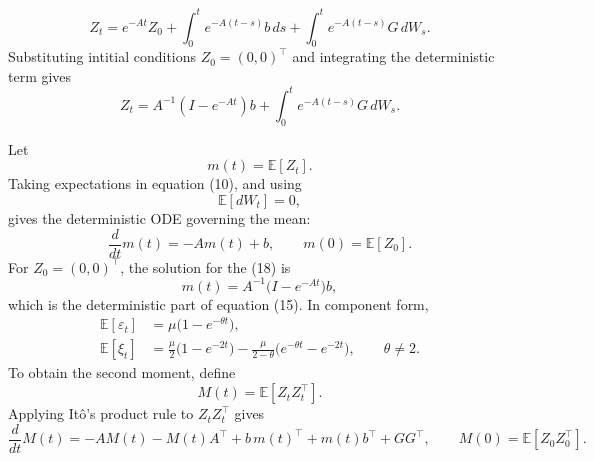 \documentclass[11pt]{article}
\begin{document}
\begin{equation}
    Z_t=e^{-At}Z_0+\int_0^t e^{-A(t-s)}b\,ds
    +\int_0^t e^{-A(t-s)}G\,dW_s.
\end{equation}
Substituting intitial conditions $Z_0=(0,0)^\top$ and integrating the deterministic term gives
\begin{equation}
    Z_t=  A^{-1}(I-e^{-At})b
    +\int_0^t e^{-A(t-s)}G\,dW_s.
\end{equation}




Let
\begin{equation}
    m(t)=\mathbb{E}[Z_t].
\end{equation}
Taking expectations in equation (10), and using
\begin{equation}
    \mathbb{E}[dW_t]=0,
\end{equation}
gives the deterministic ODE governing the mean:
\begin{equation}
    \frac{d}{dt}m(t)=-A m(t)+b,
    \qquad m(0)=\mathbb{E}[Z_0].
\end{equation}
For $Z_0=(0,0)^\top$, the solution for the (18) is
\begin{equation}
    m(t)=A^{-1}\bigl(I-e^{-At}\bigr)b,
\end{equation}
which is the deterministic part of equation (15). In component form,
\begin{align}
    \mathbb{E}[\varepsilon_t]
     & =\mu\bigl(1-e^{-\theta t}\bigr),    \\
    \mathbb{E}[\xi_t]
     & =\frac{\mu}{2}\bigl(1-e^{-2t}\bigr)
    -\frac{\mu}{2-\theta}
    \bigl(e^{-\theta t}-e^{-2t}\bigr),
    \qquad \theta\ne2.
\end{align}
To obtain the second moment, define
\begin{equation}
    M(t)=\mathbb{E}\left[Z_tZ_t^\top\right].
\end{equation}
Applying It\^o's product rule to $Z_tZ_t^\top$ gives
\begin{equation}
    \frac{d}{dt}M(t)
    =-A M(t)-M(t)A^\top
    +b\,m(t)^\top+m(t)b^\top+GG^\top,
    \qquad M(0)=\mathbb{E}[Z_0Z_0^\top].
\end{equation}
\end{document}
